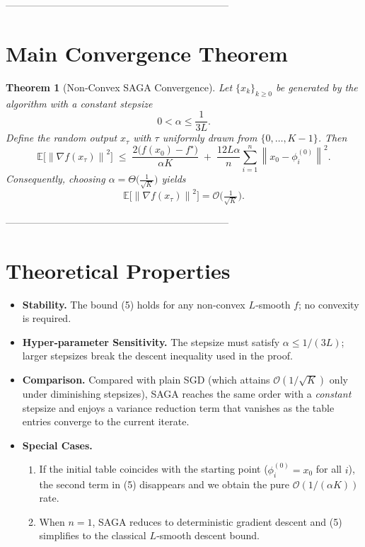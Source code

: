 \documentclass{article}
\newtheorem{theorem}{Theorem}
\newcommand{\E}{\mathbb{E}}
\newcommand{\norm}[1]{\left\|#1\right\|}
\newcommand{\grad}{\nabla}
\begin{document}
--------------------------------------------------------------------

\section*{Main Convergence Theorem}
\begin{theorem}[Non‑Convex SAGA Convergence]\label{thm:main}
Let $\{x_k\}_{k\ge0}$ be generated by the algorithm with a constant stepsize
\[
0<\alpha\le\frac{1}{3L}.
\]
Define the random output $x_{\tau}$ with $\tau$ uniformly drawn from $\{0,\dots,K-1\}$.
Then
\[
\E\!\bigl[\norm{\grad f(x_{\tau})}^{2}\bigr]
\;\le\;
\frac{2\bigl(f(x_{0})-f^{\star}\bigr)}{\alpha K}
\;+\;
\frac{12L\alpha}{n}\sum_{i=1}^{n}\norm{x_{0}-\phi_i^{(0)}}^{2}.
\tag{5}
\]
Consequently, choosing $\alpha = \Theta\!\bigl(\tfrac{1}{\sqrt{K}}\bigr)$ yields
\[
\E\!\bigl[\norm{\grad f(x_{\tau})}^{2}\bigr]=\mathcal{O}\!\bigl(\tfrac{1}{\sqrt{K}}\bigr).
\]
\end{theorem}

--------------------------------------------------------------------

\section*{Theoretical Properties}
\begin{itemize}
\item \textbf{Stability.} The bound (5) holds for any non‑convex $L$‑smooth $f$; no convexity is required.
\item \textbf{Hyper‑parameter Sensitivity.} The stepsize must satisfy $\alpha\le 1/(3L)$; larger stepsizes break the descent inequality used in the proof.
\item \textbf{Comparison.} Compared with plain SGD (which attains $\mathcal{O}(1/\sqrt{K})$ only under diminishing stepsizes), SAGA reaches the same order with a \emph{constant} stepsize and enjoys a variance reduction term that vanishes as the table entries converge to the current iterate.
\item \textbf{Special Cases.}
    \begin{enumerate}
        \item If the initial table coincides with the starting point ($\phi_i^{(0)}=x_0$ for all $i$), the second term in (5) disappears and we obtain the pure $\mathcal{O}(1/(\alpha K))$ rate.
        \item When $n=1$, SAGA reduces to deterministic gradient descent and (5) simplifies to the classical $L$‑smooth descent bound.
    \end{enumerate}
\end{itemize}
\end{document}
